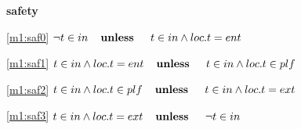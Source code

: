 \textbf{safety}
\begin{block}
\item[ \eqref{m1:saf0} ]$\neg t \in in  \textbf{\quad unless \quad} t \in in \land loc.t = ent $ %
\item[ \eqref{m1:saf1} ]$t \in in \land loc.t = ent  \textbf{\quad unless \quad} t \in in \land loc.t \in plf $ %
\item[ \eqref{m1:saf2} ]$t \in in \land loc.t \in plf  \textbf{\quad unless \quad} t \in in \land loc.t = ext $ %
\item[ \eqref{m1:saf3} ]$t \in in \land loc.t = ext  \textbf{\quad unless \quad} \neg t \in in $ %
\end{block}
